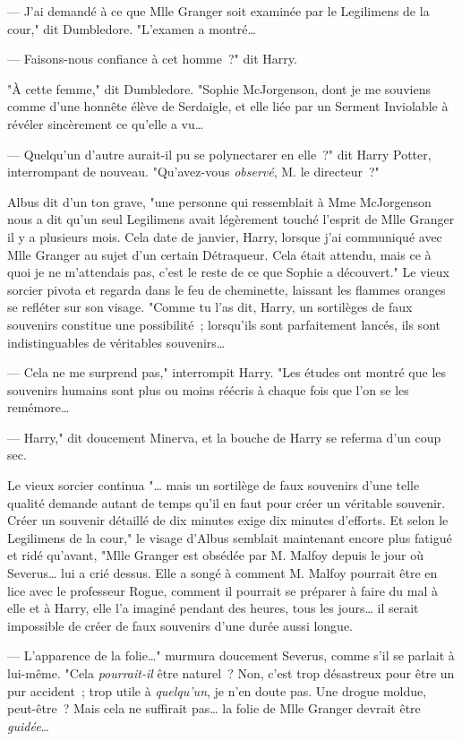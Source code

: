 --- J'ai demandé à ce que Mlle Granger soit examinée par le Legilimens de la cour," dit Dumbledore. "L'examen a montré…

--- Faisons-nous confiance à cet homme~?" dit Harry.

"À cette femme," dit Dumbledore. "Sophie McJorgenson, dont je me souviens comme d'une honnête élève de Serdaigle, et elle liée par un Serment Inviolable à révéler sincèrement ce qu'elle a vu…

--- Quelqu'un d'autre aurait-il pu se polynectarer en elle~?" dit Harry Potter, interrompant de nouveau. "Qu'avez-vous \emph{observé}, M. le directeur~?"

Albus dit d'un ton grave, "une personne qui ressemblait à Mme McJorgenson nous a dit qu'un seul Legilimens avait légèrement touché l'esprit de Mlle Granger il y a plusieurs mois. Cela date de janvier, Harry, lorsque j'ai communiqué avec Mlle Granger au sujet d'un certain Détraqueur. Cela était attendu, mais ce à quoi je ne m'attendais pas, c'est le reste de ce que Sophie a découvert." Le vieux sorcier pivota et regarda dans le feu de cheminette, laissant les flammes oranges se refléter sur son visage. "Comme tu l'as dit, Harry, un sortilèges de faux souvenirs constitue une possibilité~; lorsqu'ils sont parfaitement lancés, ils sont indistinguables de véritables souvenirs…

--- Cela ne me surprend pas," interrompit Harry. "Les études ont montré que les souvenirs humains sont plus ou moins réécris à chaque fois que l'on se les remémore…

--- Harry," dit doucement Minerva, et la bouche de Harry se referma d'un coup sec.

Le vieux sorcier continua "… mais un sortilège de faux souvenirs d'une telle qualité demande autant de temps qu'il en faut pour créer un véritable souvenir. Créer un souvenir détaillé de dix minutes exige dix minutes d'efforts. Et selon le Legilimens de la cour," le visage d'Albus semblait maintenant encore plus fatigué et ridé qu'avant, "Mlle Granger est obsédée par M. Malfoy depuis le jour où Severus… lui a crié dessus. Elle a songé à comment M. Malfoy pourrait être en lice avec le professeur Rogue, comment il pourrait se préparer à faire du mal à elle et à Harry, elle l'a imaginé pendant des heures, tous les jours… il serait impossible de créer de faux souvenirs d'une durée aussi longue.

--- L'apparence de la folie…" murmura doucement Severus, comme s'il se parlait à lui-même. "Cela \emph{pourrait-il} être naturel~? Non, c'est trop désastreux pour être un pur accident~; trop utile à \emph{quelqu'un}, je n'en doute pas. Une drogue moldue, peut-être~? Mais cela ne suffirait pas… la folie de Mlle Granger devrait être \emph{guidée}…

